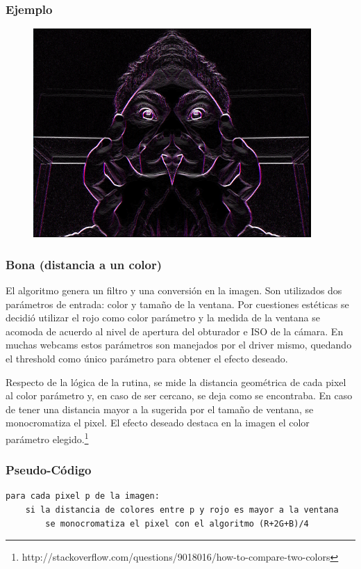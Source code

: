 \subsubsection*{Ejemplo}
\begin{center}
  \begin{figure}[H]
  \includegraphics[scale=0.60]{imgs/sobel.png}
  \end{figure}  
\end{center}  

\subsubsection{Bona (distancia a un color)}

El algoritmo genera un filtro y una conversi\'on en la imagen. Son utilizados dos par\'ametros de entrada: color y tamaño de la ventana. Por cuestiones est\'eticas se decidi\'o utilizar el rojo como color par\'ametro y la medida de la ventana se acomoda de acuerdo al nivel de apertura del obturador e ISO de la c\'amara. En muchas webcams estos par\'ametros son manejados por el driver mismo, quedando el threshold como \'unico par\'ametro para obtener el efecto deseado.

Respecto de la l\'ogica de la rutina, se mide la distancia geom\'etrica de cada pixel al color par\'ametro y, en caso de ser cercano, se deja como se encontraba. En caso de tener una distancia mayor a la sugerida por el tamaño de ventana, se monocromatiza el pixel. El efecto deseado destaca en la imagen el color par\'ametro elegido.\footnote{http://stackoverflow.com/questions/9018016/how-to-compare-two-colors}

\subsubsection*{Pseudo-C\'odigo}
\begin{verbatim}
para cada pixel p de la imagen:
    si la distancia de colores entre p y rojo es mayor a la ventana
        se monocromatiza el pixel con el algoritmo (R+2G+B)/4
\end{verbatim}
